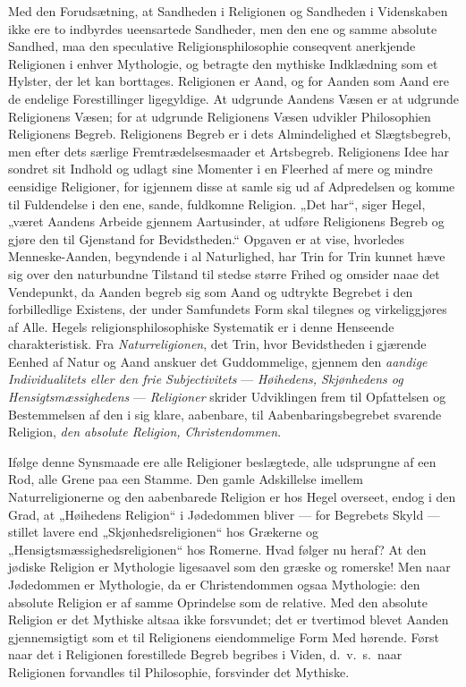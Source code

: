 \documentclass[12pt]{book}
\begin{document}
Med den Forudsætning, at Sandheden i Religionen og Sandheden i
Videnskaben ikke ere to indbyrdes ueensartede Sandheder, men den ene
og samme absolute Sandhed, maa den speculative Religionsphilosophie
conseqvent anerkjende Religionen i enhver Mythologie, og betragte
den mythiske Indklædning som et Hylster, der let kan borttages.
Religionen er Aand, og for Aanden som Aand ere de endelige
Forestillinger ligegyldige. At udgrunde Aandens Væsen er at udgrunde
Religionens Væsen; for at udgrunde Religionens Væsen udvikler
Philosophien Religionens Begreb. Religionens Begreb er i dets
Almindelighed et Slægtsbegreb, men efter dets særlige
Fremtrædelsesmaader et Artsbegreb. Religionens Idee har sondret sit
Indhold og udlagt sine Momenter i en Fleerhed af mere og mindre
eensidige Religioner, for igjennem disse at samle sig ud af
Adpredelsen og komme
til Fuldendelse i den ene, sande, fuldkomne Religion. „Det har“,
siger Hegel, „været Aandens Arbeide gjennem Aartusinder, at udføre
Religionens Begreb og gjøre den til Gjenstand for Bevidstheden.“
Opgaven er at vise, hvorledes Menneske-Aanden, begyndende i al
Naturlighed, har Trin for Trin kunnet hæve sig over den naturbundne
Tilstand til stedse større Frihed og omsider naae det Vendepunkt, da
Aanden begreb sig som Aand og udtrykte Begrebet i den forbilledlige
Existens, der under Samfundets Form skal tilegnes og virkeliggjøres
af Alle. Hegels religionsphilosophiske Systematik er i denne
Henseende charakteristisk. Fra \emph{Naturreligionen}, det Trin,
hvor Bevidstheden i gjærende Eenhed af Natur og Aand anskuer det
Guddommelige, gjennem den \emph{aandige Individualitets eller den
frie Subjectivitets} --- \emph{Høihedens, Skjønhedens og
Hensigtsmæssighedens} --- \emph{Religioner} skrider Udviklingen frem
til Opfattelsen og Bestemmelsen af den i sig klare, aabenbare, til
Aabenbaringsbegrebet svarende Religion, \emph{den absolute Religion,
Christendommen}.

Ifølge denne Synsmaade ere alle Religioner beslægtede, alle
udsprungne af een Rod, alle Grene paa een Stamme. Den gamle
Adskillelse imellem Naturreligionerne og den aabenbarede Religion er
hos Hegel overseet, endog i den Grad, at „Høihedens Religion“ i
Jødedommen bliver --- for Begrebets Skyld --- stillet lavere end
„Skjønhedsreligionen“ hos Grækerne og „Hensigtsmæssighedsreligionen“
hos Romerne. Hvad følger nu heraf? At den jødiske Religion er
Mythologie ligesaavel som den græske og romerske! Men naar
Jødedommen er Mythologie, da er Christendommen ogsaa Mythologie: den
absolute Religion er af samme Oprindelse som de relative. Med den
absolute Religion er det Mythiske altsaa ikke forsvundet; det er
tvertimod blevet Aanden gjennemsigtigt som et til Religionens
eiendommelige Form Med\-
hørende. Først naar det i Religionen forestillede Begreb begribes i
Viden, d.\ v.\ s.\ naar Religionen forvandles til Philosophie,
forsvinder det Mythiske.
\end{document}
